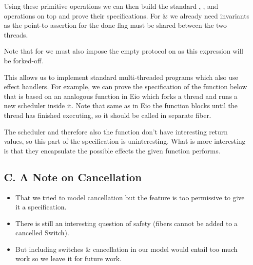 Using these primitive operations we can then build the standard , , and  operations on top and prove their specifications.
For  \&  we already need invariants as the point-to assertion for the done flag must be shared between the two threads.





Note that for  we must also impose the empty protocol on  as this expression will be forked-off.

This allows us to implement standard multi-threaded programs which also use effect handlers.
For example, we can prove the specification of the function below that is based on an analogous function in Eio which forks a thread and runs a new scheduler inside it.
Note that same as in Eio the function blocks until the thread has finished executing, so it should be called in separate fiber.



The scheduler  and therefore also the  function don't have interesting return values, so this part of the specification is uninteresting.
What is more interesting is that they encapsulate the possible effects the given function  performs.

\subsection*{C. A Note on Cancellation}
\label{sec:apdx-cancellation}

\begin{itemize}
	\item That we tried to model cancellation but the feature is too permissive to give it a specification.
	\item There is still an interesting question of safety (fibers cannot be added to a cancelled Switch).
	\item But including switches \& cancellation in our model would entail too much work so we leave it for future work.
\end{itemize}
